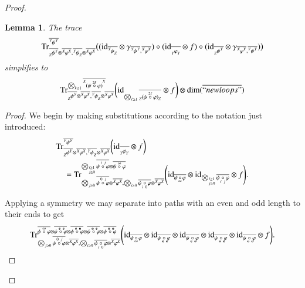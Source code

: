 \documentclass{amsart}
\def\tn{\textnormal}
\def\dim{\tn{dim}}
\def\Trace{\tn{Tr}}
\def\ol{\overline}
\def\id{\tn{id}}
\def\bfe{{\bf e}}
\def\bfo{{\bf o}}
\newcommand{\feeddd}[3]{{\tensor*[^{#2}_{\color{white}{!}}]{{#1}}{^{#3}}}}%
\newcommand{\feeddc}[3]{{\tensor*[^{#2}]{{#1}}{_{#3}}}}
\newcommand{\feedcd}[3]{{\tensor*[_{#2}]{{#1}}{^{#3}}}}
\newcommand{\feedcc}[3]{{\tensor*[^{\color{white}{!}}_{#2}]{{#1}}{_{#3}}}}
\newtheorem{lemma}[subsubsection]{Lemma}
\theoremstyle{remark}
\theoremstyle{definition}
\begin{document}
\begin{proof}
\begin{lemma}
 The trace
 \[\Trace^{\ol{\feeddd{\psi}{Y}{Y}}}_{\ol{\feedcd{\psi}{Z}{Y}}\otimes\ol{\feeddd{\varphi}{X}{X}},\ol{\feeddc{\psi}{Y}{Z}}\otimes\ol{\feeddd{\varphi}{X}{X}}}
\big(
(\id_{\ol{\feeddc{\psi}{Y}{Z}}}\otimes\gamma_{\ol{\feeddd{\psi}{Y}{Y}},\ol{\feeddd{\varphi}{X}{X}}})\circ(\id_{\ol{\feedcc{\varphi}{Y}{Y}}}\otimes f)\circ(\id_{\ol{\feedcd{\psi}{Z}{Y}}}\otimes\gamma_{\ol{\feeddd{\varphi}{X}{X}},\ol{\feeddd{\psi}{Y}{Y}}})
\big)\]
simplifies to
\[\Trace^{\bigotimes_{k\ge1}\ol{\feeddd{(\psi\;\accentset{2k}{\circ}\;\varphi)}{X}{X}}
}_{\ol{\feedcd{\psi}{Z}{Y}}\otimes\ol{\feeddd{\varphi}{X}{X}},\ol{\feeddc{\psi}{Y}{Z}}\otimes\ol{\feeddd{\varphi}{X}{X}}}
\bigg(
\id_{\bigotimes_{\ell\ge1}\ol{\feedcc{(\psi\;\accentset{2\ell}{\circ}\;\varphi)}{Z}{Z}}
}\otimes f
\bigg)\otimes\dim(\ol{``newloops"})\]
\end{lemma}
\begin{proof} 
 We begin by making substitutions according to the notation just introduced:
 \begin{align*}
  &\Trace^{\ol{\feeddd{\psi}{Y}{Y}}}_{\ol{\feedcd{\psi}{Z}{Y}}\otimes\ol{\feeddd{\varphi}{X}{X}},\ol{\feeddc{\psi}{Y}{Z}}\otimes\ol{\feeddd{\varphi}{X}{X}}}
\bigg(\id_{\ol{\feedcc{\varphi}{Y}{Y}}}\otimes f\bigg)\\
  &\quad=\Trace^{\bigotimes_{\substack{\scriptscriptstyle i\ge1\\ \scriptscriptstyle j\ge0}}\ol{\psi\;\accentset{\,i\ j}{\circ}\;\varphi}\otimes\ol{\psi\;\accentset{\infty}{\circ}\;\varphi}}_{\bigotimes_{j\ge0}\ol{\psi\;\accentset{\,0\ j}{\circ}\;\varphi}\otimes\ol{\feeddd{\varphi}{X}{X}},\bigotimes_{i\ge0}\ol{\psi\;\underaccent{\,i\ 0}{\circ}\;\varphi}\otimes\ol{\feeddd{\varphi}{X}{X}}}
\Bigg(\id_{\ol{\psi\,\underaccent{\,\infty}{\circ}\,\varphi}}\otimes\id_{\bigotimes_{\substack{\scriptscriptstyle i\ge1\\ \scriptscriptstyle j\ge0}}\ol{\psi\;\underaccent{\,i\ j}{\circ}\;\varphi}}\otimes f\Bigg).
\end{align*}

Applying a symmetry we may separate into paths with an even and odd length to their ends to get
 \begin{align*}
  \Trace^{\ol{\psi\;\accentset{\infty}{\circ}\;\varphi}\otimes\ol{\psi\;\accentset{\ \bfe\ \bfe}{\circ}\;\varphi}\otimes\ol{\psi\;\accentset{\ \bfe\ \bfo}{\circ}\;\varphi}\otimes\ol{\psi\;\accentset{\ \bfo\ \bfe}{\circ}\;\varphi}\otimes\ol{\psi\;\accentset{\ \bfo\ \bfo}{\circ}\;\varphi}}_{\bigotimes_{j\ge0}\ol{\psi\;\accentset{\,0\ j}{\circ}\;\varphi}\otimes\ol{\feeddd{\varphi}{X}{X}},\bigotimes_{i\ge0}\ol{\psi\;\underaccent{\,i\ 0}{\circ}\;\varphi}\otimes\ol{\feeddd{\varphi}{X}{X}}}
\Bigg(\id_{\ol{\psi\,\underaccent{\,\infty}{\circ}\,\varphi}}\otimes\id_{\ol{\psi\;\underaccent{\,\ \bfe\ \bfe}{\circ}\;\varphi}}\otimes\id_{\ol{\psi\;\underaccent{\,\ \bfe\ \bfo}{\circ}\;\varphi}}\otimes\id_{\ol{\psi\;\underaccent{\,\ \bfo\ \bfe}{\circ}\;\varphi}}\otimes\id_{\ol{\psi\;\underaccent{\,\ \bfo\ \bfo}{\circ}\;\varphi}}\otimes f\Bigg).
\end{align*}


\end{proof}
\end{proof}
\end{document}
